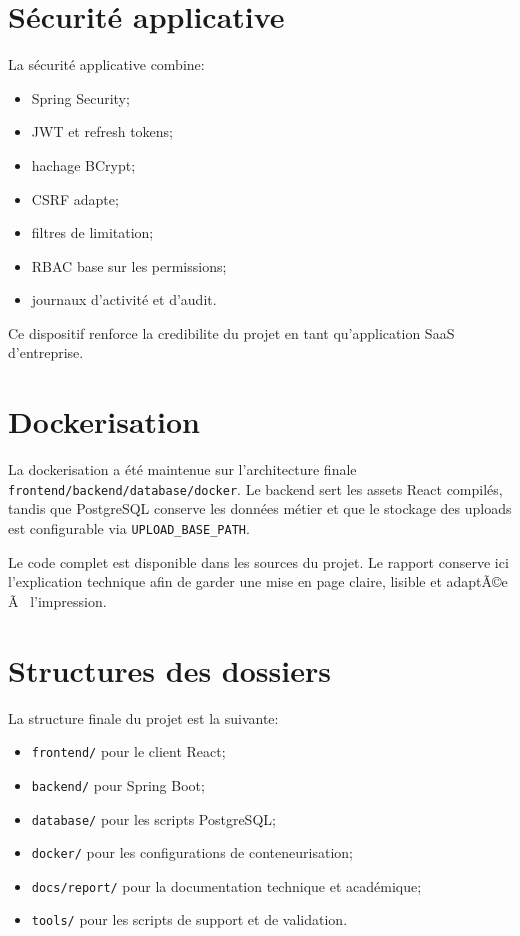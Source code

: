 ﻿\documentclass[12pt,a4paper,oneside]{report}
\newenvironment{codeblock}[1][]{
  \par
  \captionsetup{type=figure}
}{
  \par
}
\begin{document}
\section{Sécurité applicative}
La sécurité applicative combine:
\begin{itemize}
  \item Spring Security;
  \item JWT et refresh tokens;
  \item hachage BCrypt;
  \item CSRF adapte;
  \item filtres de limitation;
  \item RBAC base sur les permissions;
  \item journaux d'activité et d'audit.
\end{itemize}

Ce dispositif renforce la credibilite du projet en tant qu'application SaaS d'entreprise.

\section{Dockerisation}
La dockerisation a été maintenue sur l'architecture finale \texttt{frontend/back\-end/database/docker}. Le backend sert les assets React compilés, tandis que PostgreSQL conserve les données métier et que le stockage des uploads est configurable via \texttt{UPLOAD\_BASE\_PATH}.

\begin{codeblock}[H]
\caption{Dockerfile de l'application Spring Boot}
\begin{keybox}
Le code complet est disponible dans les sources du projet. Le rapport conserve ici l'explication technique afin de garder une mise en page claire, lisible et adaptÃ©e Ã  l'impression.
\end{keybox}
\end{codeblock}

\section{Structures des dossiers}
La structure finale du projet est la suivante:
\begin{itemize}
  \item \texttt{frontend/} pour le client React;
  \item \texttt{backend/} pour Spring Boot;
  \item \texttt{database/} pour les scripts PostgreSQL;
  \item \texttt{docker/} pour les configurations de conteneurisation;
  \item \texttt{docs/report/} pour la documentation technique et académique;
  \item \texttt{tools/} pour les scripts de support et de validation.
\end{itemize}
\end{document}
